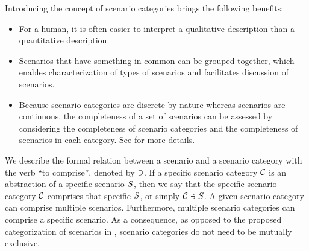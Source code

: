 Introducing the concept of scenario categories brings the following benefits:
\begin{itemize}
	\item For a human, it is \cstartd often \cendd easier to interpret a qualitative description than a quantitative description.
	\item \cstartd Scenarios that have something in common can be grouped together, which enables characterization of types of scenarios and facilitates discussion of scenarios. \cendd
	\item \cstartd Because scenario categories are discrete by nature whereas scenarios are continuous, the completeness of a set of scenarios can be assessed by considering the completeness of scenario categories and the completeness of scenarios in each category. \cendd
	See \autocite{degelder2019completeness} for more details.
\end{itemize}

We describe the formal relation between a scenario and a scenario category with the verb ``to comprise'', denoted by $\ni$. If a specific scenario category $\mathcal{C}$ is an abstraction of a specific scenario $S$, then we say that the specific scenario category $\mathcal{C}$ comprises that specific $S$, or simply $\mathcal{C} \ni S$. 
A given scenario category can comprise multiple scenarios. %
Furthermore, multiple scenario categories can comprise a specific scenario. 
\cstartd As a consequence, as opposed to the proposed categorization of scenarios in \autocite{opdencamp2014cats, USDoT2007precrashscenarios, lenard2014typical, lara2019harmonized}, scenario categories do not need to be mutually exclusive. \cendd

